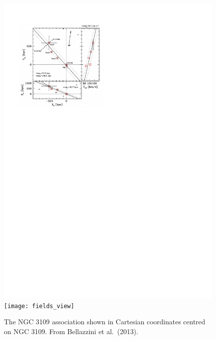 \begin{figure}
\caption{The NGC 3109 association shown in Cartesian coordinates centred on NGC 3109. From Bellazzini et al.\ (2013).}
\includegraphics[scale=0.4]{bellaz_fig1}
\texttt{[image: fields\_view]}


\end{figure}



